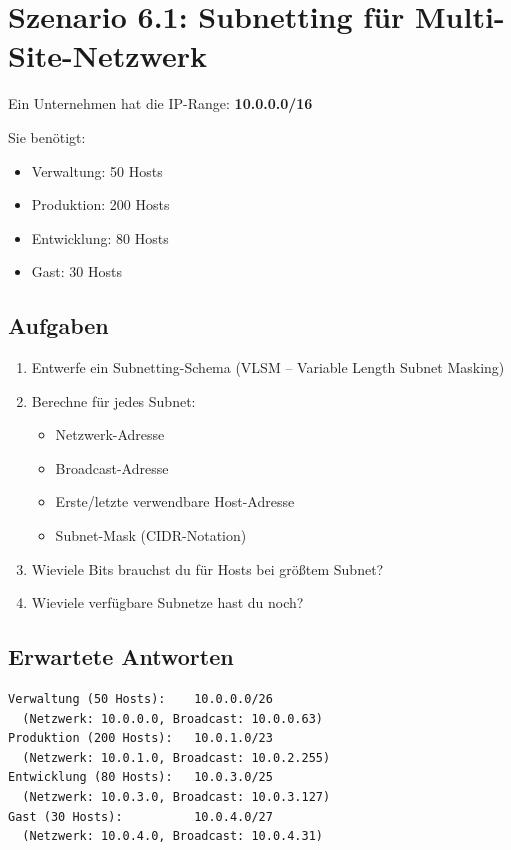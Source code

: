\documentclass[12pt,a4paper,german]{report}
\begin{document}
\section{Szenario 6.1: Subnetting für Multi-Site-Netzwerk}

Ein Unternehmen hat die IP-Range: \textbf{10.0.0.0/16}

Sie benötigt:
\begin{itemize}
    \item Verwaltung: 50 Hosts
    \item Produktion: 200 Hosts
    \item Entwicklung: 80 Hosts
    \item Gast: 30 Hosts
\end{itemize}

\subsection{Aufgaben}
\begin{enumerate}
    \item Entwerfe ein Subnetting-Schema (VLSM -- Variable Length Subnet Masking)
    \item Berechne für jedes Subnet:
    \begin{itemize}
        \item Netzwerk-Adresse
        \item Broadcast-Adresse
        \item Erste/letzte verwendbare Host-Adresse
        \item Subnet-Mask (CIDR-Notation)
    \end{itemize}
    \item Wieviele Bits brauchst du für Hosts bei größtem Subnet?
    \item Wieviele verfügbare Subnetze hast du noch?
\end{enumerate}

\subsection{Erwartete Antworten}
\begin{lstlisting}
Verwaltung (50 Hosts):    10.0.0.0/26
  (Netzwerk: 10.0.0.0, Broadcast: 10.0.0.63)
Produktion (200 Hosts):   10.0.1.0/23
  (Netzwerk: 10.0.1.0, Broadcast: 10.0.2.255)
Entwicklung (80 Hosts):   10.0.3.0/25
  (Netzwerk: 10.0.3.0, Broadcast: 10.0.3.127)
Gast (30 Hosts):          10.0.4.0/27
  (Netzwerk: 10.0.4.0, Broadcast: 10.0.4.31)
\end{lstlisting}
\end{document}
